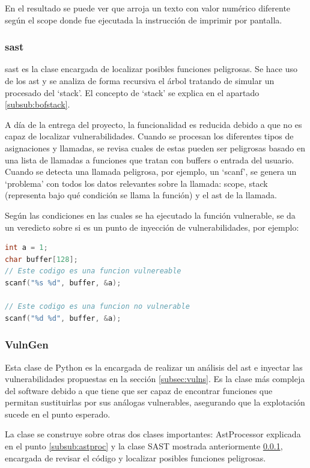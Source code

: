 En el resultado se puede ver que arroja un texto con valor numérico diferente según el scope donde fue ejecutada la instrucción de imprimir por pantalla.

\subsubsection{\acrshort{sast}} \label{subsub:sast}
\acrshort{sast} es la clase encargada de localizar posibles funciones peligrosas.
Se hace uso de los \acrshort{ast} y se analiza de forma recursiva el árbol tratando de simular un procesado del `stack'. El concepto de `stack' se explica en el apartado \ref{subsub:bofstack}.

A día de la entrega del proyecto, la funcionalidad es reducida debido a que no es capaz de localizar vulnerabilidades. Cuando se procesan los diferentes tipos de asignaciones y llamadas, se revisa cuales de estas pueden ser peligrosas basado en una lista de llamadas a funciones que tratan con buffers o entrada del usuario.
Cuando se detecta una llamada peligrosa, por ejemplo, un `scanf', se genera un `problema' con todos los datos relevantes sobre la llamada: scope, stack (representa bajo qué condición se llama la función) y el \acrshort{ast} de la llamada.

Según las condiciones en las cuales se ha ejecutado la función vulnerable, se da un veredicto sobre si es un punto de inyección de vulnerabilidades, por ejemplo:

\begin{lstlisting}[language=C, caption=Funciones peligrosas]
int a = 1;
char buffer[128];
// Este codigo es una funcion vulnereable
scanf("%s %d", buffer, &a);

// Este codigo es una funcion no vulnerable
scanf("%d %d", buffer, &a);
\end{lstlisting}

\subsubsection{VulnGen}
Esta clase de Python es la encargada de realizar un análisis del \acrshort{ast} e inyectar las vulnerabilidades propuestas en la sección \ref{subsec:vulns}. Es la clase más compleja del software debido a que tiene que ser capaz de encontrar funciones que permitan sustituirlas por sus análogas vulnerables, asegurando que la explotación sucede en el punto esperado.

La clase se construye sobre otras dos clases importantes: AstProcessor explicada en el punto \ref{subsub:astproc} y la clase SAST mostrada anteriormente \ref{subsub:sast}, encargada de revisar el código y localizar posibles funciones peligrosas.

